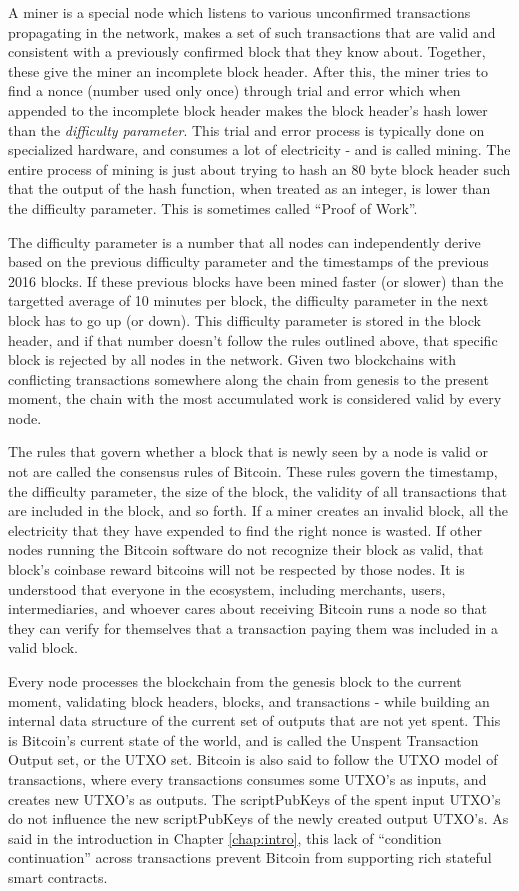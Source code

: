 A miner is a special node which listens to various unconfirmed transactions propagating in the network, makes a set of such transactions that are valid and consistent with a previously confirmed block that they know about. Together, these give the miner an incomplete block header. After this, the miner tries to find a nonce (number used only once) through trial and error which when appended to the incomplete block header makes the block header's hash lower than the \textit{difficulty parameter}. This trial and error process is typically done on specialized hardware, and consumes a lot of electricity - and is called mining. The entire process of mining is just about trying to hash an 80 byte block header such that the output of the hash function, when treated as an integer, is lower than the difficulty parameter. This is sometimes called ``Proof of Work''.

The difficulty parameter is a number that all nodes can independently derive based on the previous difficulty parameter and the timestamps of the previous 2016 blocks. If these previous blocks have been mined faster (or slower) than the targetted average of 10 minutes per block, the difficulty parameter in the next block has to go up (or down). This difficulty parameter is stored in the block header, and if that number doesn't follow the rules outlined above, that specific block is rejected by all nodes in the network. Given two blockchains with conflicting transactions somewhere along the chain from genesis to the present moment, the chain with the most accumulated work is considered valid by every node.

The rules that govern whether a block that is newly seen by a node is valid or not are called the consensus rules of Bitcoin. These rules govern the timestamp, the difficulty parameter, the size of the block, the validity of all transactions that are included in the block, and so forth. If a miner creates an invalid block, all the electricity that they have expended to find the right nonce is wasted. If other nodes running the Bitcoin software do not recognize their block as valid, that block's coinbase reward bitcoins will not be respected by those nodes. It is understood that everyone in the ecosystem, including merchants, users, intermediaries, and whoever cares about receiving Bitcoin runs a node so that they can verify for themselves that a transaction paying them was included in a valid block.

Every node processes the blockchain from the genesis block to the current moment, validating block headers, blocks, and transactions - while building an internal data structure of the current set of outputs that are not yet spent. This is Bitcoin's current state of the world, and is called the Unspent Transaction Output set, or the UTXO set. Bitcoin is also said to follow the UTXO model of transactions, where every transactions consumes some UTXO's as inputs, and creates new UTXO's as outputs. The scriptPubKeys of the spent input UTXO's do not influence the new scriptPubKeys of the newly created output UTXO's. As said in the introduction in Chapter \ref{chap:intro}, this lack of ``condition continuation'' across transactions prevent Bitcoin from supporting rich stateful smart contracts.

